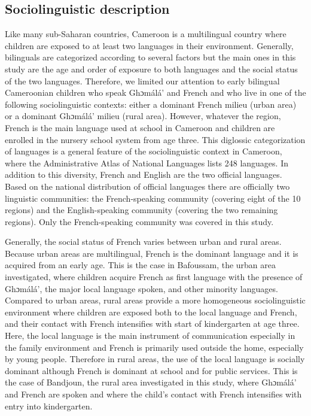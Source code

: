 \documentclass[output=paper,newtxmath,modfonts,nonflat,draftmode]{langsci/langscibook}
\begin{document}
\subsection{Sociolinguistic description}  %
\label{sec:takam:2.1}
Like many sub-Saharan countries, Cameroon is a multilingual country where children are exposed to at least two languages in their environment. Generally, bilinguals are categorized according to several factors but the main ones in this study are the age and order of exposure to both languages and the social status of the two languages. Therefore, we limited our attention to early bilingual Cameroonian children who speak Ghɔmálá’ and French and who live in one of the following sociolinguistic contexts: either a dominant French milieu (urban area) or a dominant Ghɔmálá’ milieu (rural area). However, whatever the region, French is the main language used at school in Cameroon and children are enrolled in the nursery school system from age three. This diglossic categorization of languages is a general feature of the sociolinguistic context in Cameroon, where the Administrative Atlas of National Languages \citep{Breton1991} lists 248 languages. In addition to this diversity, French and English are the two official languages. Based on the national distribution of official languages there are officially two linguistic communities: the French-speaking community (covering eight of the 10 regions) and the English-speaking community (covering the two remaining regions). Only the French-speaking community was covered in this study. 

Generally, the social status of French varies between urban and rural areas. Because urban areas are multilingual, French is the dominant language and it is acquired from an early age. This is the case in Bafoussam, the urban area investigated, where children acquire French as first language with the presence of Ghɔmálá’, the major local language spoken, and other minority languages. Compared to urban areas, rural areas provide a more homogeneous sociolinguistic environment where children are exposed both to the local language and French, and their contact with French intensifies with start of kindergarten at age three. Here, the local language is the main instrument of communication especially in the family environment and French is primarily used outside the home, especially by young people. Therefore in rural areas, the use of the local language is socially dominant although French is dominant at school and for public services. This is the case of Bandjoun, the rural area investigated in this study, where Ghɔmálá’ and French are spoken and where the child’s contact with French intensifies with entry into kindergarten. 
\end{document}
